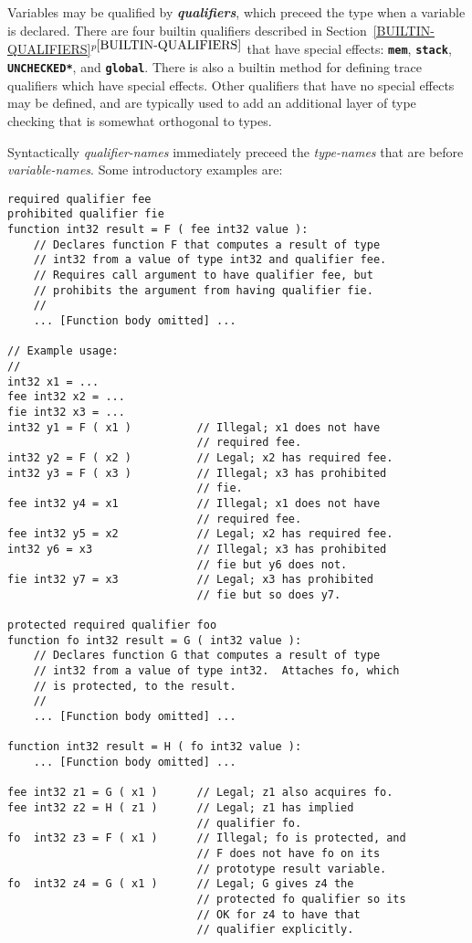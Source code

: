 \documentclass[12pt]{article}
\newcommand{\TT}[1]{{\tt \bfseries #1}}
\newcommand{\skey}[2]{{\bf \em #1#2}\index{#1}}
\newcommand{\itemref}[1]{\ref{#1}$^{p\pageref{#1}}$}
\newenvironment{indpar}[1][0.3in]%
	{\begin{list}{}%
		     {\setlength{\itemsep}{0in}%
		      \setlength{\topsep}{0in}%
		      \setlength{\parsep}{1ex}%
		      \setlength{\labelwidth}{#1}%
		      \setlength{\leftmargin}{#1}%
		      \addtolength{\leftmargin}{\labelsep}}%
	 \item}%
	{\end{list}}
\begin{document}
Variables may be qualified by \skey{qualifier}s, which preceed the
type when a variable is declared.  There are four builtin qualifiers
described in Section~\itemref{BUILTIN-QUALIFIERS} that have special
effects: \TT{mem}, \TT{stack}, \TT{*UNCHECKED*}, and \TT{global}.
There is also a builtin method for defining trace qualifiers which
have special effects.
Other qualifiers that have no special effects
may be defined, and are typically used to add an
additional layer of type checking that is somewhat orthogonal to
types.

Syntactically {\em qualifier-names} immediately preceed the {\em type-names}
that are before {\em variable-names}.  Some introductory examples are:
\begin{indpar}\begin{verbatim}
required qualifier fee
prohibited qualifier fie
function int32 result = F ( fee int32 value ):
    // Declares function F that computes a result of type
    // int32 from a value of type int32 and qualifier fee.
    // Requires call argument to have qualifier fee, but
    // prohibits the argument from having qualifier fie.
    //
    ... [Function body omitted] ...

// Example usage:
//
int32 x1 = ...
fee int32 x2 = ...
fie int32 x3 = ...
int32 y1 = F ( x1 )          // Illegal; x1 does not have
                             // required fee.
int32 y2 = F ( x2 )          // Legal; x2 has required fee.
int32 y3 = F ( x3 )          // Illegal; x3 has prohibited
                             // fie.
fee int32 y4 = x1            // Illegal; x1 does not have
                             // required fee.
fee int32 y5 = x2            // Legal; x2 has required fee.
int32 y6 = x3                // Illegal; x3 has prohibited
                             // fie but y6 does not.
fie int32 y7 = x3            // Legal; x3 has prohibited
                             // fie but so does y7.

protected required qualifier foo
function fo int32 result = G ( int32 value ):
    // Declares function G that computes a result of type
    // int32 from a value of type int32.  Attaches fo, which
    // is protected, to the result.
    //
    ... [Function body omitted] ...

function int32 result = H ( fo int32 value ):
    ... [Function body omitted] ...

fee int32 z1 = G ( x1 )      // Legal; z1 also acquires fo.
fee int32 z2 = H ( z1 )      // Legal; z1 has implied
                             // qualifier fo.
fo  int32 z3 = F ( x1 )      // Illegal; fo is protected, and
                             // F does not have fo on its
                             // prototype result variable.
fo  int32 z4 = G ( x1 )      // Legal; G gives z4 the
                             // protected fo qualifier so its
                             // OK for z4 to have that
                             // qualifier explicitly.


\end{verbatim}
\end{indpar}
\end{document}
